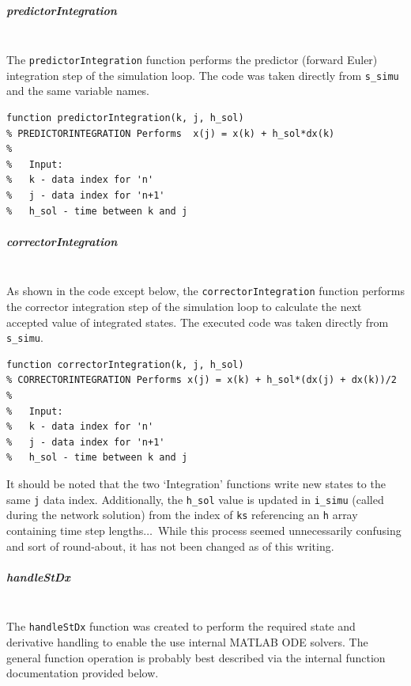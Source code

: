 \documentclass[12pt]{article}
\begin{document}
\subparagraph{predictorIntegration} \ \\
The \verb|predictorIntegration| function performs the predictor (forward Euler) integration step of the simulation loop.
The code was taken directly from \verb|s_simu| and the same variable names.

\begin{verbatim}
function predictorIntegration(k, j, h_sol)
% PREDICTORINTEGRATION Performs  x(j) = x(k) + h_sol*dx(k)
%
%   Input:
%   k - data index for 'n'
%   j - data index for 'n+1'
%   h_sol - time between k and j
\end{verbatim}


\subparagraph{correctorIntegration} \ \\
As shown in the code except below, the \verb|correctorIntegration| function performs the corrector integration step of the simulation loop to calculate the next accepted value of integrated states.
The executed code was taken directly from \verb|s_simu|.

\begin{verbatim}
function correctorIntegration(k, j, h_sol)
% CORRECTORINTEGRATION Performs x(j) = x(k) + h_sol*(dx(j) + dx(k))/2
%
%   Input:
%   k - data index for 'n'
%   j - data index for 'n+1'
%   h_sol - time between k and j
\end{verbatim}

It should be noted that the two `Integration' functions write new states to the same \verb|j| data index.
Additionally, the \verb|h_sol| value is updated in \verb|i_simu| (called during the network solution) from the index of \verb|ks| referencing an \verb|h| array containing time step lengths$\ldots$\ 
While this process seemed unnecessarily confusing and sort of  round-about, it has not been changed as of this writing.

\pagebreak
\subparagraph{handleStDx} \ \\
The \verb|handleStDx| function was created to perform the required state and derivative handling to enable the use internal MATLAB ODE solvers.
The general function operation is probably best described via the internal function documentation provided below.
\end{document}
